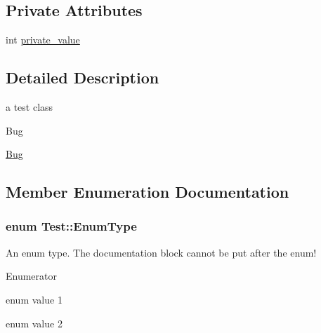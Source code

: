 \subsection*{Private Attributes}
\begin{DoxyCompactItemize}
\item 
int \hyperlink{classTest_a54d452cda3663a038c91b7dd04188be7}{private\+\_\+value}
\end{DoxyCompactItemize}


\subsection{Detailed Description}
a test class 

\begin{DoxyRefDesc}{Bug}
\item[\hyperlink{bug__bug000001}{Bug}]\end{DoxyRefDesc}


\subsection{Member Enumeration Documentation}
\hypertarget{classTest_a26bf93efdaea3c6e2cfa4119c3755d3f}{}
\subsubsection[{Enum\+Type}]{\setlength{\rightskip}{0pt plus 5cm}enum {\bf Test\+::\+Enum\+Type}}\label{classTest_a26bf93efdaea3c6e2cfa4119c3755d3f}
An enum type. The documentation block cannot be put after the enum! \begin{Desc}
\item[Enumerator]\par
\begin{description}
\item[{\em 
\hypertarget{classTest_a26bf93efdaea3c6e2cfa4119c3755d3faacfab1e4105c05a2e503931a0e82b5b0}{}E\+Val1\label{classTest_a26bf93efdaea3c6e2cfa4119c3755d3faacfab1e4105c05a2e503931a0e82b5b0}
}]enum value 1 \item[{\em 
\hypertarget{classTest_a26bf93efdaea3c6e2cfa4119c3755d3fae2fa04fb1c4db1f7d72b8781ba19ffcc}{}E\+Val2\label{classTest_a26bf93efdaea3c6e2cfa4119c3755d3fae2fa04fb1c4db1f7d72b8781ba19ffcc}
}]enum value 2 \end{description}
\end{Desc}


